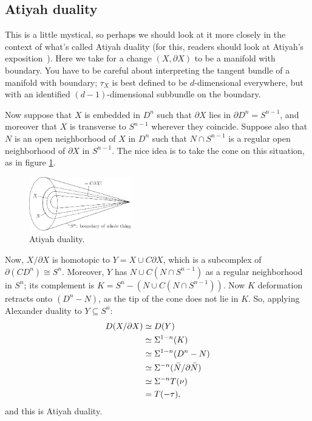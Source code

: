 \subsection*{Atiyah duality}
This is a little mystical, so perhaps we should look at it more closely in the context of what's called Atiyah duality (for this, readers should look at Atiyah's exposition~\cite{Atiyah}).  Here we take for a change $(X, \partial X)$ to be a manifold with boundary.  You have to be careful about interpreting the tangent bundle of a manifold with boundary; $\tau_X$ is best defined to be $d$-dimensional everywhere, but with an identified $(d-1)$-dimensional subbundle on the boundary.  %

Now suppose that $X$ is embedded in $D^n$ such that $\partial X$ lies in $\partial D^n=S^{n-1}$, and moreover that $X$ is transverse to $S^{n-1}$ wherever they coincide. Suppose also that $N$ is an open neighborhood of $X$ in $D^n$ such that $N\cap S^{n-1}$ is a regular open neighborhood of $\partial X$ in $S^{n-1}$.
The nice idea is to take the cone on this situation, as in figure \ref{AtiyahDuality}.
\begin{figure}[ht!]
\centering\includegraphics[width=0.4\textwidth]{figures/figure29.pdf}
\caption{\small Atiyah duality.}\label{AtiyahDuality}
\end{figure}

Now, $X / \partial X$ is homotopic to  $Y = X \cup C \partial X$, which is a subcomplex of $\partial(CD^n)\cong S^n$.  Moreover, $Y$ has $N \cup C(N \cap S^{n-1})$ as a regular neighborhood in $S^n$; its complement is $K=S^n - (N \cup C(N \cap S^{n-1}))$.  Now $K$ deformation retracts onto $(D^n-N)$, as the tip of the cone does not lie in $K$. So, applying Alexander duality to $Y\subseteq S^n$:
\begin{align*}
D(X / \partial X) & \simeq D(Y) \\
& \simeq \Sigma^{1-n}(K) \\
& \simeq \Sigma^{1-n}(D^n - N) \\
& \simeq \Sigma^{-n}(\bar N / \partial \bar N) \\
& \simeq \Sigma^{-n} T (\nu)\\
& = T(-\tau),
\end{align*}
and this is Atiyah duality.

